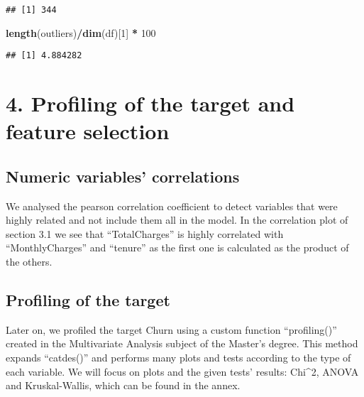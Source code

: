 \documentclass[
]{article}
\newenvironment{Shaded}{\begin{snugshade}}{\end{snugshade}}
\newcommand{\CommentTok}[1]{\textcolor[rgb]{0.56,0.35,0.01}{\textit{#1}}}
\newcommand{\DecValTok}[1]{\textcolor[rgb]{0.00,0.00,0.81}{#1}}
\newcommand{\FunctionTok}[1]{\textcolor[rgb]{0.13,0.29,0.53}{\textbf{#1}}}
\newcommand{\NormalTok}[1]{#1}
\newcommand{\SpecialCharTok}[1]{\textcolor[rgb]{0.81,0.36,0.00}{\textbf{#1}}}
\newcommand{\StringTok}[1]{\textcolor[rgb]{0.31,0.60,0.02}{#1}}
\begin{document}
\begin{verbatim}
## [1] 344
\end{verbatim}

\begin{Shaded}
\begin{Highlighting}[]
\FunctionTok{length}\NormalTok{(outliers)}\SpecialCharTok{/}\FunctionTok{dim}\NormalTok{(df)[}\DecValTok{1}\NormalTok{] }\SpecialCharTok{*} \DecValTok{100}
\end{Highlighting}
\end{Shaded}

\begin{verbatim}
## [1] 4.884282
\end{verbatim}

\hypertarget{profiling-of-the-target-and-feature-selection}{%
\section{4. Profiling of the target and feature
selection}\label{profiling-of-the-target-and-feature-selection}}

\hypertarget{numeric-variables-correlations}{%
\subsection{Numeric variables'
correlations}\label{numeric-variables-correlations}}

We analysed the pearson correlation coefficient to detect variables that
were highly related and not include them all in the model. In the
correlation plot of section 3.1 we see that ``TotalCharges'' is highly
correlated with ``MonthlyCharges'' and ``tenure'' as the first one is
calculated as the product of the others.

\hypertarget{profiling-of-the-target}{%
\subsection{Profiling of the target}\label{profiling-of-the-target}}

Later on, we profiled the target Churn using a custom function
``profiling()'' created in the Multivariate Analysis subject of the
Master's degree. This method expands ``catdes()'' and performs many
plots and tests according to the type of each variable. We will focus on
plots and the given tests' results: Chi\^{}2, ANOVA and Kruskal-Wallis,
which can be found in the annex.

\begin{Shaded}
\end{Shaded}
\end{document}
